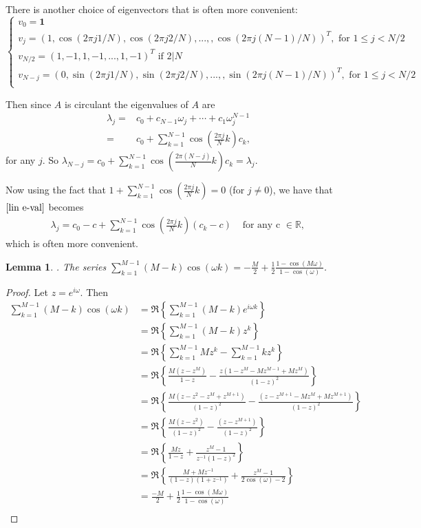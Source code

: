 \documentclass{article}
\newcommand{\R}{\mathbb{R}}
\newtheorem{lem}[thm]{Lemma}
\newcommand{\1}{\mathbf{1}}
\newcommand{\0}{\mathbf{0}}
\begin{document}
There is another choice of eigenvectors that is often more convenient:  
$$
\begin{cases}
v_0 = \1 \\
v_j = (1,\cos(2\pi j 1/N),\cos(2\pi j 2/N),...,,\cos(2\pi j (N-1)/N))^T, \mbox{ for } 1 \leq j < N/2 \\
v_{N/2} = (1,-1,1,-1,...,1,-1)^T \mbox{ if } 2|N \\
v_{N-j} = (0,\sin(2\pi j 1/N),\sin(2\pi j 2/N),...,,\sin(2\pi j (N-1)/N))^T, \mbox{ for } 1 \leq j < N/2 \\
\end{cases}
$$

Then since $A$ is circulant the eigenvalues of $A$ are 
\begin{align} \label{lin e-val}
\lambda_j =& c_0 + c_{N-1} \omega_j + \cdots + c_1 \omega_j^{N-1} \nonumber \\
=& c_0 + \sum_{k=1}^{N-1} \cos(\frac{2\pi j}{N} k) c_k, 
\end{align}
for any $j$. 
So $\lambda_{N-j} = c_0 + \sum_{k=1}^{N-1} \cos(\frac{2\pi (N-j)}{N} k) c_k = \lambda_j$.

Now using the fact that $1 + \sum_{k=1}^{N-1} \cos(\frac{2\pi j}{N} k) = 0$ (for $j \neq 0$), we have that $\ref{lin e-val}$ becomes
\begin{align} \label{alt lin e-val}
\lambda_j = c_0 - c + \sum_{k=1}^{N-1} \cos(\frac{2\pi j}{N} k) (c_k-c) 	&	\mbox{ for any c $\in \R$, }
\end{align}
which is often more convenient.  

\begin{lem} \label{sum for lin dec f's}.
The series
$\sum_{k = 1}^{M-1} (M-k) \cos(\omega k) = -\frac{M}{2} + \frac{1}{2} \frac{1-\cos(M\omega)}{1-\cos(\omega)}$.
\end{lem}
\begin{proof}
Let $z = e^{i \omega }$.  Then 
\begin{align*}
\sum_{k = 1}^{M-1} (M-k) \cos(\omega k) &= \Re \left\{ \sum_{k = 1}^{M-1} (M-k) e^{i \omega k} \right\} \\
&= \Re \left\{ \sum_{k = 1}^{M-1} (M-k) z^k \right\} \\
&= \Re \left\{ \sum_{k = 1}^{M-1} M z^k - \sum_{k = 1}^{M-1} k z^k \right\} \\
&= \Re \left\{ \frac{M(z-z^M)}{1 - z} - \frac{z (1 - z^{M} -Mz^{M-1} + Mz^{M})}{(1-z)^2} \right\} \\
&= \Re \left\{ \frac{M(z-z^2-z^M+z^{M+1})}{(1 - z)^2} - \frac{(z - z^{M+1} -Mz^{M} + Mz^{M+1})}{(1-z)^2} \right\} \\
&= \Re \left\{ \frac{M(z-z^2)}{(1 - z)^2} - \frac{(z - z^{M+1})}{(1-z)^2} \right\} \\
&= \Re \left\{ \frac{Mz}{1 - z} + \frac{z^{M} - 1}{z^{-1}(1-z)^2} \right\} \\
&= \Re \left\{ \frac{M+Mz^{-1}}{(1 - z)(1 + z^{-1})} + \frac{z^{M} - 1}{2\cos(\omega)-2} \right\} \\
&= \frac{-M}{2} + \frac 12 \frac{1-\cos(M\omega)}{1-\cos(\omega)} \\
\end{align*}
\end{proof}
\end{document}
